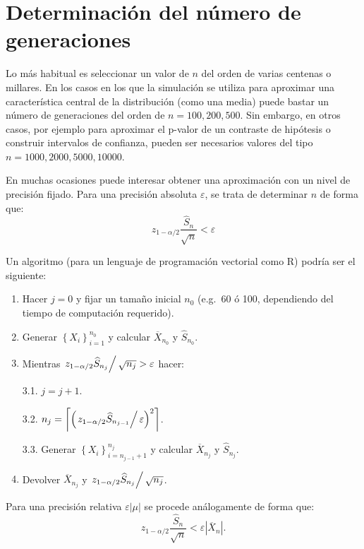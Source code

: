 \documentclass[
  10pt,
]{book}
\theoremstyle{break}
\theoremstyle{nonumberplain}
\begin{document}
\hypertarget{num-gen}{%
\section{Determinación del número de generaciones}\label{num-gen}}

Lo más habitual es seleccionar un valor de \(n\) del orden de varias centenas o millares.
En los casos en los que la simulación se utiliza para aproximar una característica central de la distribución (como una media) puede bastar un número de generaciones del orden de \(n = 100, 200, 500\).
Sin embargo, en otros casos, por ejemplo para aproximar el p-valor de un contraste de hipótesis o construir intervalos de confianza, pueden ser necesarios valores del tipo \(n = 1000, 2000, 5000, 10000\).

En muchas ocasiones puede interesar obtener una aproximación con un nivel de precisión fijado.
Para una precisión absoluta \(\varepsilon\), se trata de determinar
\(n\) de forma que:
\[z_{1-\alpha /2}\dfrac{\widehat{S}_{n}}{\sqrt{n}}<\varepsilon\]

Un algoritmo (para un lenguaje de programación vectorial como R) podría ser el siguiente:

\begin{enumerate}
\def\labelenumi{\arabic{enumi}.}
\item
  Hacer \(j=0\)
  y fijar un tamaño inicial \(n_{0}\) (e.g.~60 ó 100, dependiendo del tiempo de computación requerido).
\item
  Generar \(\left\{ X_{i}\right\} _{i=1}^{n_{0}}\)
  y calcular \(\overline{X}_{n_0}\) y \(\widehat{S}_{n_{0}}\).
\item
  Mientras \(\left. z_{1-\alpha /2}\widehat{S}_{n_j}\right/ \sqrt{n_{j}}>\varepsilon\) hacer:

  3.1. \(j=j+1\).

  3.2. \(n_{j}=\left\lceil \left( \left. z_{1-\alpha /2}\widehat{S}  _{n_{j-1}}\right/ \varepsilon \right)^{2}\right\rceil\).

  3.3. Generar \(\left\{ X_{i}\right\}_{i=n_{j-1}+1}^{n_j}\)
  y calcular \(\overline{X}_{n_j}\) y \(\widehat{S}_{n_j}\).
\item
  Devolver \(\overline{X}_{n_j}\) y \(\left. z_{1-\alpha /2}\widehat{S}_{n_j}\right/ \sqrt{n_{j}}\).
\end{enumerate}

Para una precisión relativa \(\varepsilon \left\vert \mu \right\vert\) se procede análogamente de forma que:
\[z_{1-\alpha /2}\dfrac{\widehat{S}_{n}}{\sqrt{n}}<\varepsilon \left\vert 
\overline{X}_{n}\right\vert .\]
\end{document}
